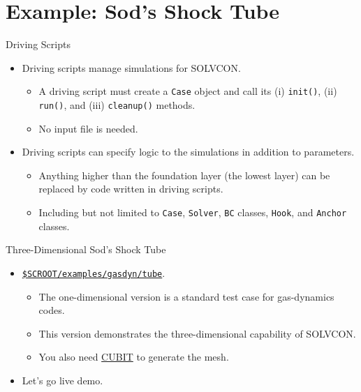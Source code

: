 \documentclass[dvips,xcolor=pst,14pt]{beamer}
\begin{document}
\section{
Example: Sod's Shock Tube
}

\begin{frame}{
%
Driving Scripts
%
}
\begin{itemize}
  \item Driving scripts manage simulations for SOLVCON.
  \begin{itemize}
    \item A driving script must create a \texttt{Case} object and call its (i)
    \texttt{init()}, (ii) \texttt{run()}, and (iii) \texttt{cleanup()} methods.
    \item No input file is needed.
  \end{itemize}
  \item Driving scripts can specify \alert{logic} to the simulations in addition to
  parameters.
  \begin{itemize}
    \item Anything higher than the foundation layer (the lowest layer) can be
    \alert{replaced} by code written in driving scripts.
    \item Including but not limited to \texttt{Case}, \texttt{Solver},
    \texttt{BC} classes, \texttt{Hook}, and \texttt{Anchor} classes.
  \end{itemize}
\end{itemize}
\end{frame}

\begin{frame}[fragile]{
%
Three-Dimensional Sod's Shock Tube
%
}
\begin{itemize}
  \item
  \href{https://bitbucket.org/solvcon/solvcon/src/09bcbc949751/examples/gasdyn/tube}{\texttt{\$SCROOT/examples/gasdyn/tube}}.
  \begin{itemize}
    \item The one-dimensional version is a standard test case for gas-dynamics
    codes.
    \item This version demonstrates the three-dimensional capability of
    SOLVCON.
    \item You also need \href{http://cubit.sandia.gov/}{CUBIT} to generate the
    mesh.
  \end{itemize}
  \item Let's go live demo.
\end{itemize}
\end{frame}
\end{document}
